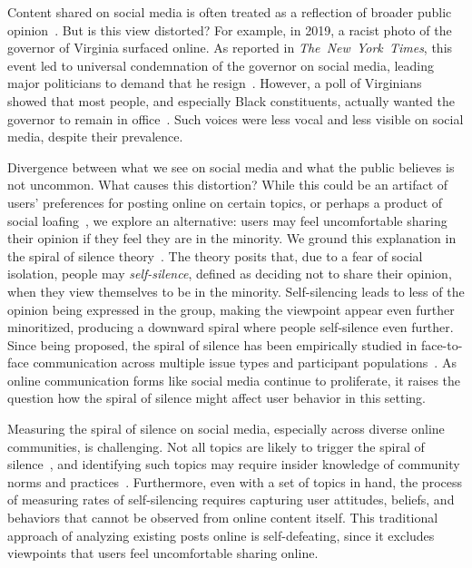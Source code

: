 Content shared on social media is often treated as a reflection of broader public opinion~\cite{anstead2015social,mcgregor2020taking,asur2010predicting}. But is this view distorted? For example, in 2019, a racist photo of the governor of Virginia surfaced online. As reported in \textit{The~New~York~Times}, this event led to universal condemnation of the governor on social media, leading major politicians to demand that he resign~\cite{cohn2019dem}. However, a poll of Virginians showed that most people, and especially Black constituents, actually wanted the governor to remain in office~\cite{jamison2012wapo}. Such voices were less vocal and less visible on social media, despite their prevalence.


Divergence between what we see on social media and what the public believes is not uncommon. What causes this distortion? While this could be an artifact of users' preferences for posting online on certain topics, or perhaps a product of social loafing~\cite{karau1993social}, we explore an alternative: users may feel uncomfortable sharing their opinion if they feel they are in the minority. We ground this explanation in the spiral of silence theory~\cite{noelle1974spiral}. The theory posits that, due to a fear of social isolation, people may \textit{self-silence}, defined as deciding not to share their opinion, when they view themselves to be in the minority. Self-silencing leads to less of the opinion being expressed in the group, making the viewpoint appear even further minoritized, producing a downward spiral where people self-silence even further. Since being proposed, the spiral of silence has been empirically studied in face-to-face communication across multiple issue types and participant populations~\cite{scheufle2000twenty,matthes2018spiral}. As online communication forms like social media continue to proliferate, it raises the question how the spiral of silence might affect user behavior in this setting.

Measuring the spiral of silence on social media, especially across diverse online communities, is challenging. Not all topics are likely to trigger the spiral of silence~\cite{lee2004cross}, and identifying such topics may require insider knowledge of community norms and practices~\cite{chen2013and,hessel2019something}. Furthermore, even with a set of topics in hand, the process of measuring rates of self-silencing requires capturing user attitudes, beliefs, and behaviors that cannot be observed from online content itself. This traditional approach of analyzing existing posts online is self-defeating, since it excludes viewpoints that users feel uncomfortable sharing online. 


